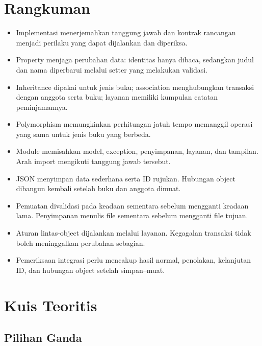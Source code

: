 \section{Rangkuman}

\begin{itemize}
  \item Implementasi menerjemahkan tanggung jawab dan kontrak rancangan menjadi perilaku yang dapat dijalankan dan diperiksa.
  \item Property menjaga perubahan data: identitas hanya dibaca, sedangkan judul dan nama diperbarui melalui setter yang melakukan validasi.
  \item Inheritance dipakai untuk jenis buku; association menghubungkan transaksi dengan anggota serta buku; layanan memiliki kumpulan catatan peminjamannya.
  \item Polymorphism memungkinkan perhitungan jatuh tempo memanggil operasi yang sama untuk jenis buku yang berbeda.
  \item Module memisahkan model, exception, penyimpanan, layanan, dan tampilan. Arah import mengikuti tanggung jawab tersebut.
  \item JSON menyimpan data sederhana serta ID rujukan. Hubungan object dibangun kembali setelah buku dan anggota dimuat.
  \item Pemuatan divalidasi pada keadaan sementara sebelum mengganti keadaan lama. Penyimpanan menulis file sementara sebelum mengganti file tujuan.
  \item Aturan lintas-object dijalankan melalui layanan. Kegagalan transaksi tidak boleh meninggalkan perubahan sebagian.
  \item Pemeriksaan integrasi perlu mencakup hasil normal, penolakan, kelanjutan ID, dan hubungan object setelah simpan--muat.
\end{itemize}

\section{Kuis Teoritis}

\subsection{Pilihan Ganda}

